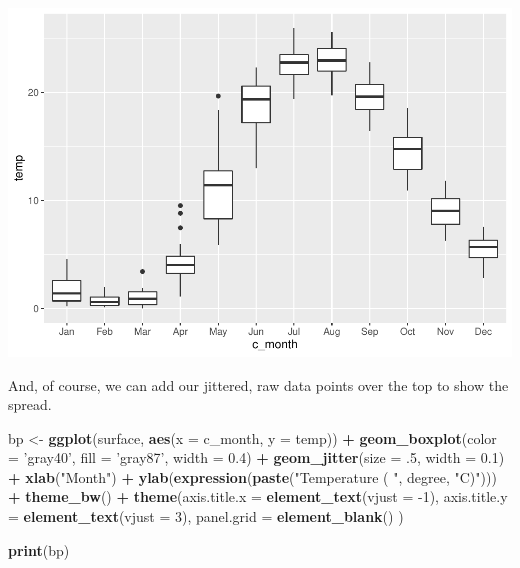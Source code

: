 \documentclass[
]{book}
\newenvironment{Shaded}{\begin{snugshade}}{\end{snugshade}}
\newcommand{\DataTypeTok}[1]{\textcolor[rgb]{0.13,0.29,0.53}{#1}}
\newcommand{\DecValTok}[1]{\textcolor[rgb]{0.00,0.00,0.81}{#1}}
\newcommand{\FloatTok}[1]{\textcolor[rgb]{0.00,0.00,0.81}{#1}}
\newcommand{\KeywordTok}[1]{\textcolor[rgb]{0.13,0.29,0.53}{\textbf{#1}}}
\newcommand{\NormalTok}[1]{#1}
\newcommand{\OperatorTok}[1]{\textcolor[rgb]{0.81,0.36,0.00}{\textbf{#1}}}
\newcommand{\StringTok}[1]{\textcolor[rgb]{0.31,0.60,0.02}{#1}}
\begin{document}
\includegraphics{worstr_files/figure-latex/unnamed-chunk-112-1.pdf}

And, of course, we can add our jittered, raw data points over the top to show the spread.

\begin{Shaded}
\begin{Highlighting}[]
\NormalTok{bp <-}\StringTok{ }\KeywordTok{ggplot}\NormalTok{(surface, }\KeywordTok{aes}\NormalTok{(}\DataTypeTok{x =}\NormalTok{ c_month, }\DataTypeTok{y =}\NormalTok{ temp)) }\OperatorTok{+}
\StringTok{  }\KeywordTok{geom_boxplot}\NormalTok{(}\DataTypeTok{color =} \StringTok{'gray40'}\NormalTok{, }\DataTypeTok{fill =} \StringTok{'gray87'}\NormalTok{, }\DataTypeTok{width =} \FloatTok{0.4}\NormalTok{) }\OperatorTok{+}
\StringTok{  }\KeywordTok{geom_jitter}\NormalTok{(}\DataTypeTok{size =} \FloatTok{.5}\NormalTok{, }\DataTypeTok{width =} \FloatTok{0.1}\NormalTok{) }\OperatorTok{+}
\StringTok{  }\KeywordTok{xlab}\NormalTok{(}\StringTok{"Month"}\NormalTok{) }\OperatorTok{+}
\StringTok{  }\KeywordTok{ylab}\NormalTok{(}\KeywordTok{expression}\NormalTok{(}\KeywordTok{paste}\NormalTok{(}\StringTok{"Temperature ( "}\NormalTok{, degree, }\StringTok{"C)"}\NormalTok{))) }\OperatorTok{+}
\StringTok{  }\KeywordTok{theme_bw}\NormalTok{() }\OperatorTok{+}
\StringTok{  }\KeywordTok{theme}\NormalTok{(}\DataTypeTok{axis.title.x =} \KeywordTok{element_text}\NormalTok{(}\DataTypeTok{vjust =} \DecValTok{-1}\NormalTok{),}
        \DataTypeTok{axis.title.y =} \KeywordTok{element_text}\NormalTok{(}\DataTypeTok{vjust =} \DecValTok{3}\NormalTok{),}
        \DataTypeTok{panel.grid =} \KeywordTok{element_blank}\NormalTok{()}
\NormalTok{  )}

\KeywordTok{print}\NormalTok{(bp)}
\end{Highlighting}
\end{Shaded}
\end{document}
